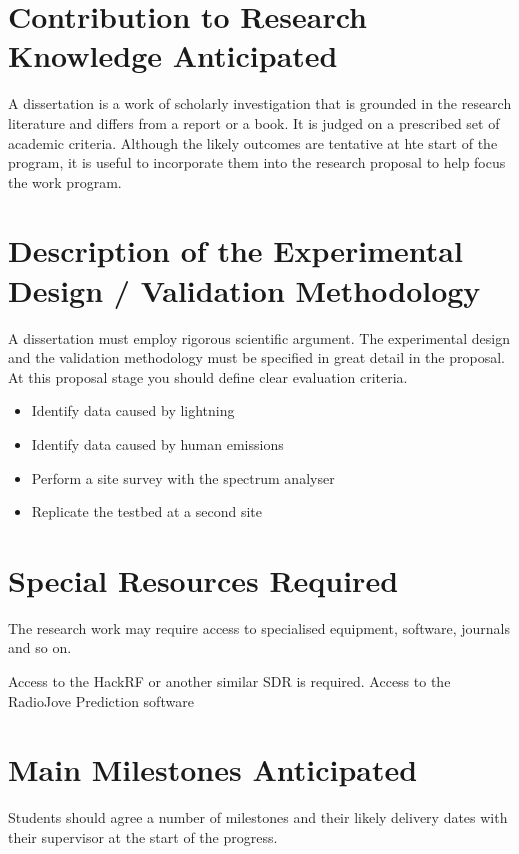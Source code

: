 \documentclass[runningheads,a4paper]{llncs}
\begin{document}
\section*{Contribution to Research Knowledge Anticipated}
%
A dissertation is a work of scholarly investigation that is grounded in the research literature and differs from a report or a book. It is judged on a prescribed set of academic criteria. Although the likely outcomes are tentative at hte start of the program, it is useful to incorporate them into the research proposal to help focus the work program.
%
%
\newpage
\section*{Description of the Experimental Design / Validation Methodology}
%
A dissertation must employ rigorous scientific argument. The experimental design and the validation methodology must be specified in great detail in the proposal. At this proposal stage you should define clear evaluation criteria.


\begin{itemize}
  \item Identify data caused by lightning
  \item Identify data caused by human emissions
  \item Perform a site survey with the spectrum analyser
  \item Replicate the testbed at a second site
\end{itemize}
%
%
\newpage
\section*{Special Resources Required}
%
The research work may require access to specialised equipment, software, journals and so on.

Access to the HackRF or another similar SDR is required.
Access to the RadioJove Prediction software
%
%
\newpage
\section*{Main Milestones Anticipated}
%
Students should agree a number of milestones and their likely delivery dates with their supervisor at the start of the progress.
\end{document}
